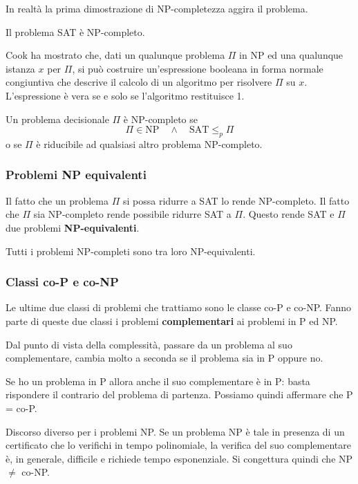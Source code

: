 In realt\`a la prima dimostrazione di NP-completezza aggira il problema.

\begin{theorem}[Cook]
	Il problema SAT \`e NP-completo.
\end{theorem}

Cook ha mostrato che, dati un qualunque problema $\Pi$ in NP ed una qualunque istanza $x$ per $\Pi$, si pu\`o costruire
un'espressione booleana in forma normale congiuntiva che descrive il calcolo di un algoritmo per risolvere $\Pi$ su $x$.
L'espressione \`e vera se e solo se l'algoritmo restituisce 1.

\begin{theorem}
	Un problema decisionale $\Pi$ \`e NP-completo se
	\[ \Pi \in \text{NP} \quad \wedge \quad \text{SAT} \leq_p \Pi \]
	o se $\Pi$ \`e riducibile ad qualsiasi altro problema NP-completo.
\end{theorem}

\subsubsection{Problemi NP equivalenti}
Il fatto che un problema $\Pi$ si possa ridurre a SAT lo rende NP-completo. Il fatto che $\Pi$ sia NP-completo rende
possibile ridurre SAT a $\Pi$. Questo rende SAT e $\Pi$ due problemi \textbf{NP-equivalenti}.

\begin{theorem}
	Tutti i problemi NP-completi sono tra loro NP-equivalenti.
\end{theorem}

\subsubsection{Classi co-P e co-NP}
Le ultime due classi di problemi che trattiamo sono le classe co-P e co-NP. Fanno parte di queste due classi i problemi
\textbf{complementari} ai problemi in P ed NP.

Dal punto di vista della complessit\`a, passare da un problema al suo complementare, cambia molto a seconda se il problema
sia in P oppure no.

Se ho un problema in P allora anche il suo complementare \`e in P: basta rispondere il contrario del problema di partenza.
Possiamo quindi affermare che P = co-P.

Discorso diverso per i problemi NP. Se un problema NP \`e tale in presenza di un certificato che lo verifichi in tempo
polinomiale, la verifica del suo complementare \`e, in generale, difficile e richiede tempo esponenziale. Si congettura
quindi che NP $\neq$ co-NP.